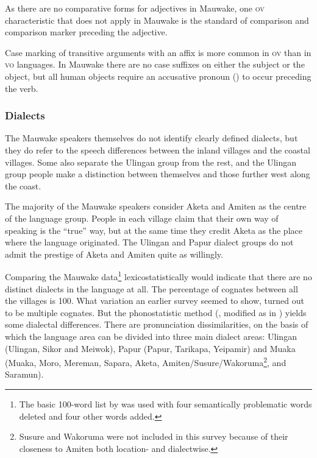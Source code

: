 As there are no comparative forms for adjectives in Mauwake, one \textsc{ov} characteristic that does not apply in Mauwake is the standard of comparison and comparison marker preceding the adjective. 

Case marking of transitive arguments with an affix is more common in \textsc{ov} than in \textsc{vo} languages.  In Mauwake there are no case suffixes on either the subject or the object, but all human objects require an accusative pronoun () to occur preceding the verb.

\subsubsection{Dialects}{\footnotemark}

The Mauwake speakers themselves do not identify clearly defined dialects, but they do refer to the speech differences between the inland villages and the coastal villages. Some also separate the Ulingan group from the rest, and the Ulingan group people make a distinction between themselves and those further west along the coast.

The majority of the Mauwake speakers consider Aketa and Amiten as the centre of the language group. People in each village claim that their own way of speaking is the ``true'' way, but at the same time they credit Aketa as the place where the language originated.  The Ulingan and Papur dialect groups do not admit the prestige of Aketa and Amiten quite as willingly.

Comparing the Mauwake data\footnote{The basic 100-word list by \citet[55--59]{Ezard1978} was used with four semantically problematic words deleted and four other words added.} lexicostatistically would indicate that there are no distinct dialects in the language at all. The percentage of cognates between all the villages is 100.  What variation an earlier survey seemed to show, turned out to be multiple cognates. But the phonostatistic method (\citealt{GrimesEtAl1959}, modified as in \citealt[177--178]{Simons1977}) yields some dialectal differences. There are pronunciation dissimilarities, on the basis of which the language area can be divided into three main dialect areas: Ulingan (Ulingan, Sikor and Meiwok), Papur (Papur, Tarikapa, Yeipamir) and Muaka (Muaka, Moro, Mereman, Sapara, Aketa, Amiten/Susure/Wakoruma\footnote{Susure and Wakoruma were not included in this survey because of their closeness to Amiten both location- and dialectwise.}, and Saramun). 

